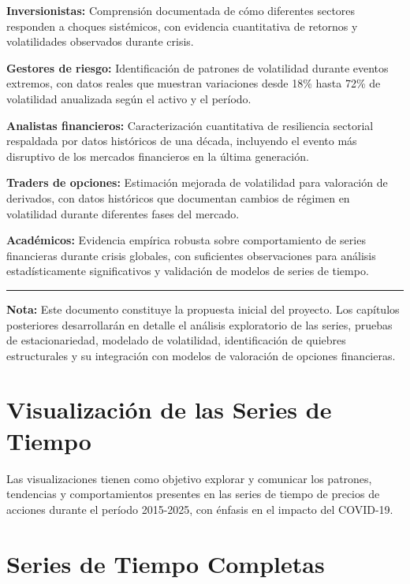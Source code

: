 \documentclass[
]{book}
\begin{document}
\textbf{Inversionistas:} Comprensión documentada de cómo diferentes sectores responden a choques sistémicos, con evidencia cuantitativa de retornos y volatilidades observados durante crisis.

\textbf{Gestores de riesgo:} Identificación de patrones de volatilidad durante eventos extremos, con datos reales que muestran variaciones desde 18\% hasta 72\% de volatilidad anualizada según el activo y el período.

\textbf{Analistas financieros:} Caracterización cuantitativa de resiliencia sectorial respaldada por datos históricos de una década, incluyendo el evento más disruptivo de los mercados financieros en la última generación.

\textbf{Traders de opciones:} Estimación mejorada de volatilidad para valoración de derivados, con datos históricos que documentan cambios de régimen en volatilidad durante diferentes fases del mercado.

\textbf{Académicos:} Evidencia empírica robusta sobre comportamiento de series financieras durante crisis globales, con suficientes observaciones para análisis estadísticamente significativos y validación de modelos de series de tiempo.

\begin{center}\rule{0.5\linewidth}{0.5pt}\end{center}

\textbf{Nota:} Este documento constituye la propuesta inicial del proyecto. Los capítulos posteriores desarrollarán en detalle el análisis exploratorio de las series, pruebas de estacionariedad, modelado de volatilidad, identificación de quiebres estructurales y su integración con modelos de valoración de opciones financieras.

\section{Visualización de las Series de Tiempo}\label{intro}

Las visualizaciones tienen como objetivo explorar y comunicar los patrones, tendencias y comportamientos presentes en las series de tiempo de precios de acciones durante el período 2015-2025, con énfasis en el impacto del COVID-19.

\section{Series de Tiempo Completas}\label{series-de-tiempo-completas}
\end{document}
